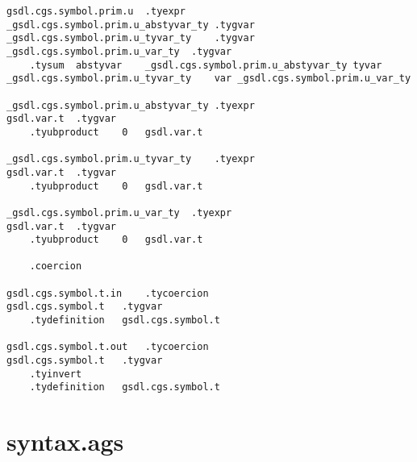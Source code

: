 \documentclass{report}
\begin{document}
\begin{verbatim}
gsdl.cgs.symbol.prim.u	.tyexpr
_gsdl.cgs.symbol.prim.u_abstyvar_ty	.tygvar
_gsdl.cgs.symbol.prim.u_tyvar_ty	.tygvar
_gsdl.cgs.symbol.prim.u_var_ty	.tygvar
	.tysum	abstyvar	_gsdl.cgs.symbol.prim.u_abstyvar_ty	tyvar	_gsdl.cgs.symbol.prim.u_tyvar_ty	var	_gsdl.cgs.symbol.prim.u_var_ty

_gsdl.cgs.symbol.prim.u_abstyvar_ty	.tyexpr
gsdl.var.t	.tygvar
	.tyubproduct	0	gsdl.var.t

_gsdl.cgs.symbol.prim.u_tyvar_ty	.tyexpr
gsdl.var.t	.tygvar
	.tyubproduct	0	gsdl.var.t

_gsdl.cgs.symbol.prim.u_var_ty	.tyexpr
gsdl.var.t	.tygvar
	.tyubproduct	0	gsdl.var.t

	.coercion

gsdl.cgs.symbol.t.in	.tycoercion
gsdl.cgs.symbol.t	.tygvar
	.tydefinition	gsdl.cgs.symbol.t

gsdl.cgs.symbol.t.out	.tycoercion
gsdl.cgs.symbol.t	.tygvar
	.tyinvert
	.tydefinition	gsdl.cgs.symbol.t
\end{verbatim}

\section{syntax.ags}
\end{document}
